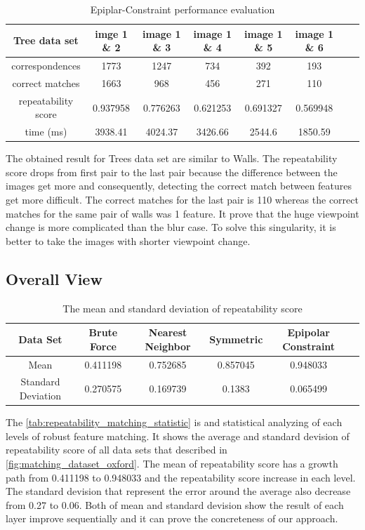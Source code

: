 \begin{table}[H]
  \begin{tabular}{| c || c | c | c | c | c | c | c |}
      \hline
      Tree data set & imge 1 \& 2 & image 1 \& 3 & image 1 \& 4 & image 1 \& 5 & image 1 \& 6 \\ \hline \hline
      correspondences & 1773 & 1247 & 734 & 392 & 193 \\ \hline
      correct matches & 1663 & 968 & 456 & 271 & 110 \\ \hline
      repeatability score & 0.937958 & 0.776263 & 0.621253 & 0.691327 & 0.569948 \\ \hline
      time (ms) & 3938.41 & 4024.37 & 3426.66 & 2544.6 & 1850.59 \\ \hline
  \end{tabular}
  \caption{Epiplar-Constraint performance evaluation} \label{tab:epipolar_matching_tree_eval}
\end{table}

The obtained result for Trees data set are similar to Walls. The repeatability score drops from first pair to the last pair because the difference between the images get more and consequently, detecting the correct match between features get more difficult. The correct matches for the last pair is 110 whereas the correct matches for the same pair of walls was 1 feature. It prove that the huge viewpoint change is more complicated than the blur case. To solve this singularity, it is better to take the images with shorter viewpoint change. 

\subsection {Overall View}
\begin{table}[H]
\centering
  \begin{tabular}{| c || c | c | c | c | c |}
      \hline
      Data Set & Brute Force & Nearest Neighbor & Symmetric & Epipolar Constraint \\ \hline \hline
      Mean & 0.411198 & 0.752685 & 0.857045 & 0.948033 \\  \hline
      Standard Deviation & 0.270575 & 0.169739 & 0.1383 & 0.065499 \\  \hline
  \end{tabular}
  \caption{The mean and standard deviation of repeatability score} \label{tab:repeatability_matching_statistic}
\end{table}

The \autoref{tab:repeatability_matching_statistic} is and statistical analyzing of each levels of robust feature matching. It shows the average and standard devision of repeatability score of all data sets that described in \autoref{fig:matching_dataset_oxford}. The mean of repeatability score has a growth path from 0.411198 to 0.948033 and the repeatability score increase in each level. The standard devision that represent the error around the average also decrease from 0.27 to 0.06. Both of mean and standard devision show the result of each layer improve sequentially and it can prove the concreteness of our approach.

